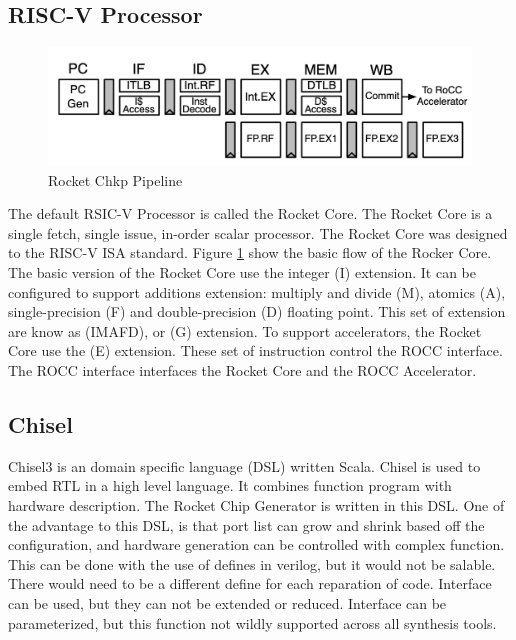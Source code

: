 \documentclass[../main.tex]{subfiles}
\begin{document}
\subsection{RISC-V Processor}
\begin{figure}
    \centering
    \includegraphics[scale=.4]{pngs/RocketPipeline.png}
    \caption{Rocket Chkp Pipeline\cite{Asanović:EECS-2016-17}}
    \label{fig:RocketCipFlow}
\end{figure}
The default RSIC-V Processor is called the Rocket Core. The Rocket Core is a single fetch, single issue, in-order scalar processor. The Rocket Core was designed to the RISC-V ISA standard. Figure \ref{fig:RocketCipFlow} show the basic flow of the Rocker Core. The basic version of the Rocket Core use the integer (I) extension. It can be configured to support additions extension: multiply and divide (M), atomics (A), single-precision (F) and double-precision (D) floating point\cite{Asanović:EECS-2016-17}. This set of extension are know as (IMAFD), or (G) extension\cite{Asanović:EECS-2016-17}. To support accelerators, the Rocket Core use the (E) extension. These set of instruction control the ROCC interface. The ROCC interface interfaces the Rocket Core and the ROCC Accelerator.
\subsection{Chisel}
Chisel3 is an domain specific language (DSL) written Scala. Chisel is used to embed RTL in a high level language. It combines function program with hardware description. The Rocket Chip Generator is written in this DSL. One of the advantage to this DSL, is that port list can grow and shrink based off the configuration, and hardware generation can be controlled with complex function. This can be done with the use of defines in verilog, but it would not be salable. There would need to be a different define for each reparation of code. Interface can be used, but they can not be extended or reduced. Interface can be parameterized, but this function not wildly supported across all synthesis tools.  
\end{document}
